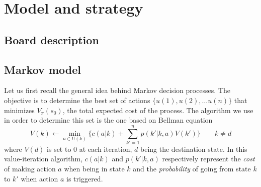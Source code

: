 \section{Model and strategy} %
\label{sec:model_and_strategy}

\subsection{Board description} %
\label{sub:board_description}

% 
% 
% 
% 

\subsection{Markov model} %
\label{sub:markov_model}
Let us first recall the general idea behind Markov decision processes.
The objective is to determine the best set of actions $\{u(1), u(2), \dots
u(n)\}$ that minimizes $V_{\pi}(s_0)$, the total expected cost of the process.
The algorithm we use in order to determine this set is the one based on Bellman equation
\[
  V(k) \leftarrow \min_{a\in U(k)} \{c(a|k) 
  + \sum_{k'=1}^n p(k'|k,a)V(k') \} \qquad k \neq d
\]
where $V(d)$ is set to 0 at each iteration, $d$ being the destination state.
In this value-iteration algorithm, $c(a|k)$ and $p(k'|k,a)$
respectively represent the \emph{cost} of making action $a$
when being in state $k$ and the \emph{probability} of going
from state $k$ to $k'$ when action $a$ is triggered.

